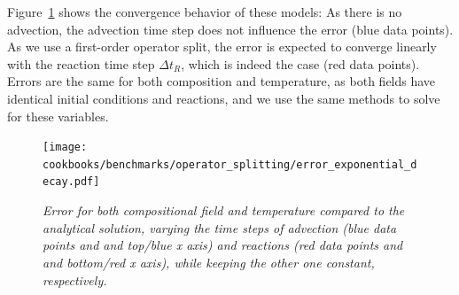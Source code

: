 \documentclass{article}
\begin{document}
Figure~\ref{fig:exponential-decay} shows the convergence behavior of these models: As there is no advection, the advection time step does not influence the error (blue data points). As we use a first-order operator split, the error is expected to converge linearly with the reaction time step $\Delta t_R$, which is indeed the case (red data points).
Errors are the same for both composition and temperature, as both fields have identical initial conditions and reactions, and we use the same methods to solve for these variables. 
\begin{figure}
  \begin{center}
    \texttt{[image: cookbooks/benchmarks/operator\_splitting/error\_exponential\_decay.pdf]}
  \end{center}
  \caption{\it Error for both compositional field and temperature compared to the analytical solution, varying the time steps of advection (blue data points and and top/blue x axis) and reactions (red data points and and bottom/red x axis), while keeping the other one constant, respectively.}
  \label{fig:exponential-decay}
\end{figure}
\end{document}

